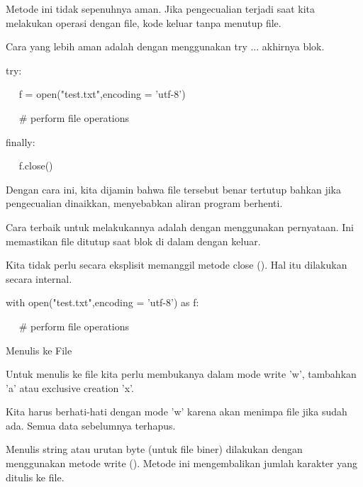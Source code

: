 Metode ini tidak sepenuhnya aman. Jika pengecualian terjadi saat kita melakukan operasi dengan file, kode keluar tanpa menutup file. \par
\vspace{12pt}
\noindent 
Cara yang lebih aman adalah dengan menggunakan try ... akhirnya blok. \par
\vspace{12pt}
\noindent 
try: \par
\noindent 
~~ f = open("test.txt",encoding = 'utf-8') \par
\noindent 
~~  $  \#  $ perform file operations \par
\noindent 
finally: \par
\noindent 
~~ f.close() \par
\vspace{12pt}
\noindent 
Dengan cara ini, kita dijamin bahwa file tersebut benar tertutup bahkan jika pengecualian dinaikkan, menyebabkan aliran program berhenti. \par
\vspace{12pt}
\noindent 
Cara terbaik untuk melakukannya adalah dengan menggunakan pernyataan. Ini memastikan file ditutup saat blok di dalam dengan keluar. \par
\vspace{12pt}
\noindent 
Kita tidak perlu secara eksplisit memanggil metode close (). Hal itu dilakukan secara internal. \par
\vspace{12pt}
\noindent 
with open("test.txt",encoding = 'utf-8') as f: \par
\noindent 
~~  $  \#  $ perform file operations \par
\vspace{12pt}
\vspace{12pt}
\vspace{12pt}
\vspace{12pt}
\noindent 
Menulis ke File \par
\vspace{12pt}
\noindent 
Untuk menulis ke file kita perlu membukanya dalam mode write 'w', tambahkan 'a' atau exclusive creation 'x'. \par
\vspace{12pt}
\noindent 
Kita harus berhati-hati dengan mode 'w' karena akan menimpa file jika sudah ada. Semua data sebelumnya terhapus. \par
\vspace{12pt}
\noindent 
Menulis string atau urutan byte (untuk file biner) dilakukan dengan menggunakan metode write (). Metode ini mengembalikan jumlah karakter yang ditulis ke file. \par
